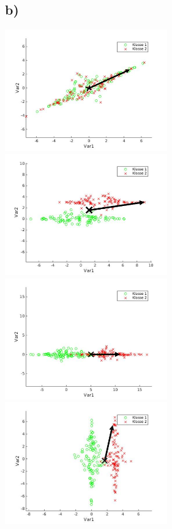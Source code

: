 \documentclass[a4paper]{scrartcl}
\begin{document}
\subsection*{b)}
\includegraphics[width=7cm]{assignment4_data/plots/A2b_bild1.png}
\includegraphics[width=7cm]{assignment4_data/plots/A2b_bild2.png}\\
\includegraphics[width=7cm]{assignment4_data/plots/A2b_bild3.png}
\includegraphics[width=7cm]{assignment4_data/plots/A2b_bild4.png}\\
\end{document}
